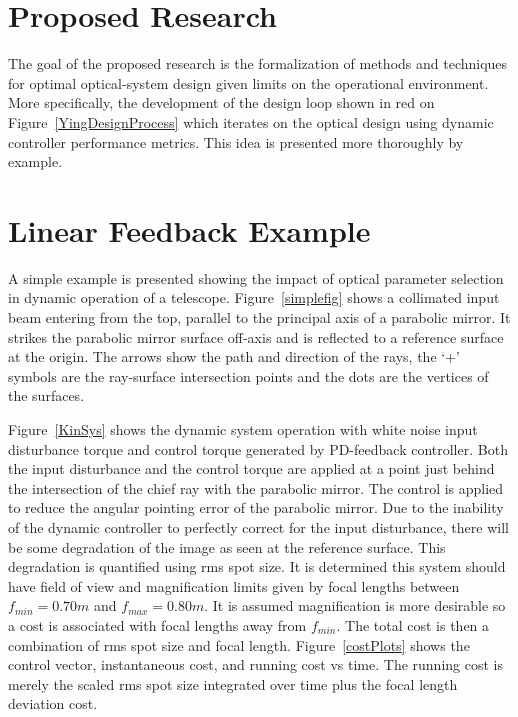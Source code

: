 \documentclass{aiaa-tc}
\begin{document}
\section{Proposed Research}

The goal of the proposed research is the formalization of methods and techniques for optimal optical-system design given limits on the operational environment. More specifically, the development of the design loop shown in red on Figure~\ref{YingDesignProcess} which iterates on the optical design using dynamic controller performance metrics. This idea is presented more thoroughly by example.

%

\section{Linear Feedback Example}

A simple example is presented showing the impact of optical parameter selection in dynamic operation of a telescope. Figure~\ref{simplefig} shows a collimated input beam entering from the top, parallel to the principal axis of a parabolic mirror. It strikes the parabolic mirror surface off-axis and is reflected to a reference surface at the origin. The arrows show the path and direction of the rays, the `+' symbols are the ray-surface intersection points and the dots are the vertices of the surfaces.



Figure~\ref{KinSys} shows the dynamic system operation with white noise input disturbance torque and control torque generated by PD-feedback controller. Both the input disturbance and the control torque are applied at a point just behind the intersection of the chief ray with the parabolic mirror. The control is applied to reduce the angular pointing error of the parabolic mirror. Due to the inability of the dynamic controller to perfectly correct for the input disturbance, there will be some degradation of the image as seen at the reference surface. This degradation is quantified using rms spot size. It is determined this system should have field of view and magnification limits given by focal lengths between $f_{min} = 0.70 m$ and $f_{max} = 0.80 m$. It is assumed magnification is more desirable so a cost is associated with focal lengths away from $f_{min}$. The total cost is then a combination of rms spot size and focal length. Figure~\ref{costPlots} shows the control vector, instantaneous cost, and running cost vs time. The running cost is merely the scaled rms spot size integrated over time plus the focal length deviation cost.
\end{document}
